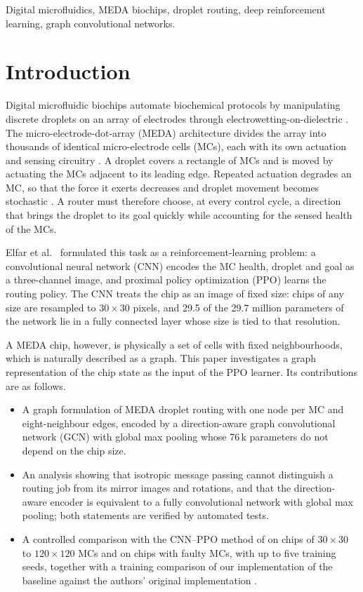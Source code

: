 \documentclass[conference,onecolumn,11pt]{IEEEtran}
\begin{document}
\begin{IEEEkeywords}
Digital microfluidics, MEDA biochips, droplet routing, deep reinforcement learning, graph
convolutional networks.
\end{IEEEkeywords}

\section{Introduction}
Digital microfluidic biochips automate biochemical protocols by manipulating discrete
droplets on an array of electrodes through electrowetting-on-dielectric
\cite{pollack2000,chakrabarty2006}. The micro-electrode-dot-array (MEDA) architecture
divides the array into thousands of identical micro-electrode cells (MCs), each with its own
actuation and sensing circuitry \cite{wang2011,li2017}. A droplet covers a rectangle of MCs
and is moved by actuating the MCs adjacent to its leading edge. Repeated actuation degrades
an MC, so that the force it exerts decreases and droplet movement becomes stochastic
\cite{elfar2023}. A router must therefore choose, at every control cycle, a direction that
brings the droplet to its goal quickly while accounting for the sensed health of the MCs.

Elfar et al.\ \cite{elfar2022date,elfar2023} formulated this task as a reinforcement-learning
problem: a convolutional neural network (CNN) encodes the MC health, droplet and goal as a
three-channel image, and proximal policy optimization (PPO) \cite{schulman2017} learns the
routing policy. The CNN treats the chip as an image of fixed size: chips of any size are
resampled to $30\times30$ pixels, and 29.5 of the 29.7 million parameters of the network
lie in a fully connected layer whose size is tied to that resolution.

A MEDA chip, however, is physically a set of cells with fixed neighbourhoods, which is
naturally described as a graph. This paper investigates a graph representation of the chip
state as the input of the PPO learner. Its contributions are as follows.
\begin{itemize}
\item A graph formulation of MEDA droplet routing with one node per MC and eight-neighbour
      edges, encoded by a direction-aware graph convolutional network (GCN) with global max
      pooling whose 76\,k parameters do not depend on the chip size.
\item An analysis showing that isotropic message passing cannot distinguish a routing job
      from its mirror images and rotations, and that the direction-aware encoder is
      equivalent to a fully convolutional network with global max pooling; both statements
      are verified by automated tests.
\item A controlled comparison with the CNN--PPO method of \cite{elfar2023} on chips of
      $30\times30$ to $120\times120$ MCs and on chips with faulty MCs, with up to five
      training seeds, together with a training comparison of our implementation of the
      baseline against the authors' original implementation \cite{elfarcode}.
\end{itemize}
\end{document}
